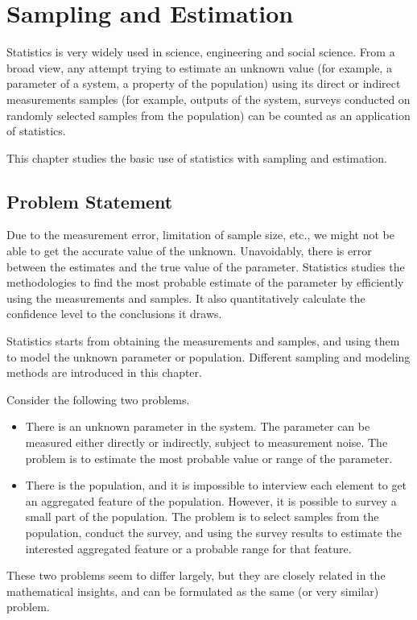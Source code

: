 \chapter{Sampling and Estimation} \label{ch:estimation}

Statistics is very widely used in science, engineering and social science. From a broad view, any attempt trying to estimate an unknown value (for example, a parameter of a system, a property of the population) using its direct or indirect measurements samples (for example, outputs of the system, surveys conducted on randomly selected samples from the population) can be counted as an application of statistics.

This chapter studies the basic use of statistics with sampling and estimation.

\section{Problem Statement} \label{sec:statisticsproblemformulation}

Due to the measurement error, limitation of sample size, etc., we might not be able to get the accurate value of the unknown. Unavoidably, there is error between the estimates and the true value of the parameter. Statistics studies the methodologies to find the most probable estimate of the parameter by efficiently using the measurements and samples. It also quantitatively calculate the confidence level to the conclusions it draws.

Statistics starts from obtaining the measurements and samples, and using them to model the unknown parameter or population. Different sampling and modeling methods are introduced in this chapter. 

Consider the following two problems.
\begin{itemize}
	\item There is an unknown parameter in the system. The parameter can be measured either directly or indirectly, subject to measurement noise. The problem is to estimate the most probable value or range of the parameter.
	\item There is the population, and it is impossible to interview each element to get an aggregated feature of the population. However, it is possible to survey a small part of the population. The problem is to select samples from the population, conduct the survey, and using the survey results to estimate the interested aggregated feature or a probable range for that feature.
\end{itemize}
These two problems seem to differ largely, but they are closely related in the mathematical insights, and can be formulated as the same (or very similar) problem. 


